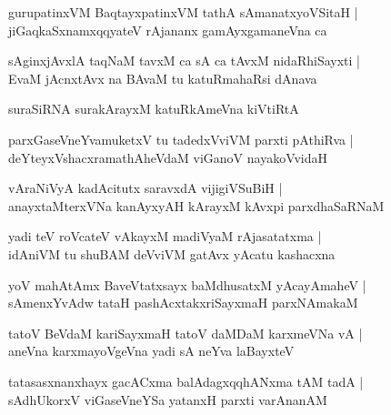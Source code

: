 \begin{shloka}
gurupatinxVM BaqtayxpatinxVM tathA sAmanatxyoVSitaH |\\
jiGaqkaSxnamxqqyateV rAjananx gamAyxgamaneVna ca 
\end{shloka}

\begin{shloka}
sAginxjAvxlA taqNaM tavxM ca sA ca tAvxM nidaRhiSayxti |\\
EvaM jAcnxtAvx na BAvaM tu katuRmahaRsi dAnava 
\end{shloka}

\begin{shloka}
suraSiRNA surakArayxM katuRkAmeVna kiVtiRtA 
\end{shloka}

\begin{shloka}
parxGaseVneYvamuketxV tu tadedxVviVM parxti pAthiRva |\\
deYteyxVshacxramathAheVdaM viGanoV nayakoVvidaH 
\end{shloka}

\begin{shloka}
vAraNiVyA kadAcitutx saravxdA vijigiVSuBiH |\\
anayxtaMterxVNa kanAyxyAH  kArayxM kAvxpi parxdhaSaRNaM 
\end{shloka}

\begin{shloka}
yadi teV roVcateV vAkayxM madiVyaM rAjasatatxma |\\
idAniVM tu shuBAM deVviVM gatAvx yAcatu kashacxna
\end{shloka}

\begin{shloka}
yoV mahAtAmx BaveVtatxsayx baMdhusatxM yAcayAmaheV |\\
sAmenxYvAdw tataH pashAcxtakxriSayxmaH parxNAmakaM 
\end{shloka}

\begin{shloka}
tatoV BeVdaM kariSayxmaH tatoV daMDaM karxmeVNa vA |\\
aneVna karxmayoVgeVna yadi sA neYva laBayxteV
\end{shloka}

\begin{shloka}
tatasasxnanxhayx gacACxma balAdagxqqhANxma tAM tadA |\\
sAdhUkorxV viGaseVneYSa yatanxH parxti varAnanAM 
\end{shloka}

